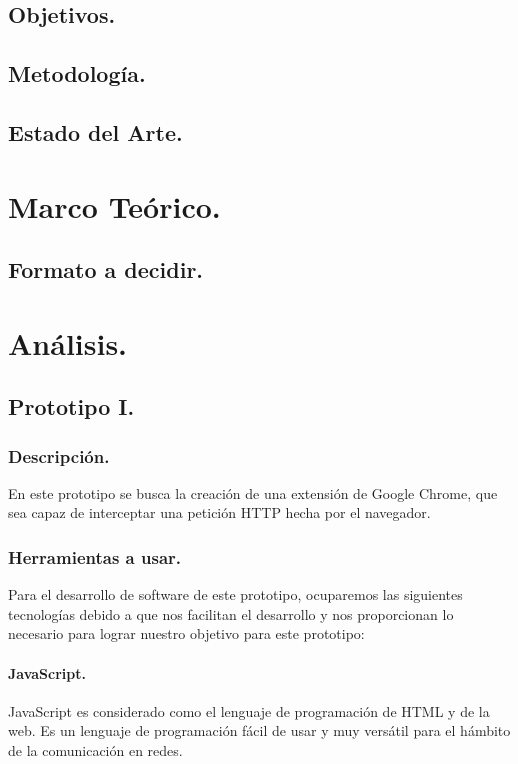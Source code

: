 \documentclass[12pt, a4paper, titlepage]{article}
\begin{document}
		\subsection{Objetivos.}
		
		\subsection{Metodología.}
		\subsection{Estado del Arte.}
	\newpage
	\section{\textcolor{azulescom}{Marco Teórico.}}
		\subsection{Formato a decidir.}
	\newpage
	\section{\textcolor{azulescom}{Análisis.}}
		\subsection{Prototipo I.}
			\subsubsection{Descripción.}
				En este prototipo se busca la creación de una extensión de Google Chrome, que sea capaz de interceptar una petición HTTP hecha por el navegador.
			\subsubsection{Herramientas a usar.}
				
				Para el desarrollo de software de este prototipo, ocuparemos las siguientes tecnologías debido a que nos facilitan el desarrollo y nos proporcionan lo necesario para lograr nuestro objetivo para este prototipo: 
				\paragraph {JavaScript. \\}
				JavaScript es considerado como el lenguaje de programación de HTML y de la web. Es un lenguaje de programación fácil de usar y muy versátil para el hámbito de la comunicación en redes. 
				
\end{document}
